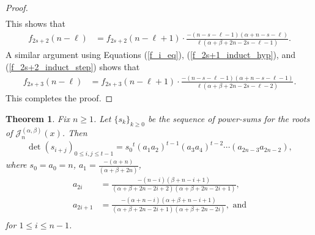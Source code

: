\documentclass[10pt,a4paper]{amsart}
\newtheorem{thm}[equation]{Theorem}
\begin{document}
\begin{proof}
\begin{align}
\end{align}
This shows that 
\begin{align}
f_{2s+2}(n-\ell)&=f_{2s+2}(n-\ell+1)\cdot\frac{-(n-s-\ell-1)(\alpha+n-s-\ell)}{\ell(\alpha+\beta+2n-2s-\ell-1)}. \label{f_2s+2_induct_step}
\end{align}
A similar argument using Equations (\ref{f_i_eq}), (\ref{f_2s+1_induct_hyp}), and (\ref{f_2s+2_induct_step}) shows that
\begin{align}
f_{2s+3}(n-\ell)
&=f_{2s+3}(n-\ell+1)\cdot\frac{-(n-s-\ell-1)(\alpha+n-s-\ell-1)}{\ell(\alpha+\beta+2n-2s-\ell-2)}. \label{f_2s+3_induct_step}
\end{align}
This completes the proof.
\end{proof}


\begin{thm} \label{elis_version}
Fix $n \geq 1$.  Let $\{s_k\}_{k\geq 0}$ be the sequence of power-sums for the roots of  $\mathscr{J}_n^{(\alpha,\beta)}(x)$.  Then 
\begin{gather*}
    \det(s_{i+j})_{0\le i,j\le t-1}={s_0}^t(a_1a_2)^{t-1}
   (a_3a_4)^{t-2}\cdots(a_{2n-3}a_{2n-2}),
\end{gather*}
where $s_0 = a_0=n$, ${a_1=\frac{-(\alpha+n)}{(\alpha+\beta+2n)}}$, 
\begin{align*}
    a_{2i}&=\frac{-(n-i)(\beta+n-i+1)}{(\alpha+\beta+2n-2i+2)(\alpha+\beta+2n-2i+1)}, \\
    a_{2i+1}&=\frac{-(\alpha+n-i)(\alpha+\beta+n-i+1)}{(\alpha+\beta+2n-2i+1)(\alpha+\beta+2n-2i)},\text{ and}\\
\end{align*}
for  $1\le i\le n-1$.
\end{thm}
\end{document}
